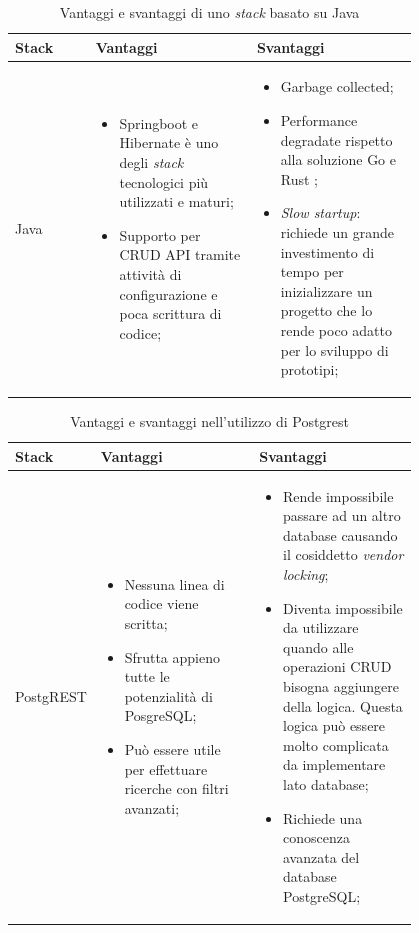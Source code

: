 \documentclass{article}
\begin{document}
\begin{table}[H]
    \centering
    \begin{tabular}{|l|p{0.4\linewidth}|p{0.4\linewidth}|}
        \hline
         Stack & Vantaggi & Svantaggi \\
        \hline
        Java  & 
        \begin{itemize}
          \item Springboot e Hibernate è uno degli \textit{stack} tecnologici più utilizzati e maturi;
          \item Supporto per CRUD API tramite attività di configurazione e poca scrittura di codice;
        \end{itemize} 
        & 
        \begin{itemize}
            \item Garbage collected;
            \item Performance degradate rispetto alla soluzione Go e Rust \cite{go_java_php} \cite{http_benchmark};
            \item \textit{Slow startup}: richiede un grande investimento di tempo per inizializzare un progetto che lo rende poco adatto per lo sviluppo di prototipi;
        \end{itemize}\\ 
        \hline
    \end{tabular}
    \caption{Vantaggi e svantaggi di uno \textit{stack} basato su Java}
    \label{tab:java_tech_stack}
\end{table}

\begin{table}[H]
  \center
  \begin{tabular}{|l|p{0.4\linewidth}|p{0.4\linewidth}|}
    \hline
         Stack & Vantaggi & Svantaggi \\
        \hline
        PostgREST & 
        \begin{itemize}
          \item Nessuna linea di codice viene scritta;
          \item Sfrutta appieno tutte le potenzialità di PosgreSQL;
          \item Può essere utile per effettuare ricerche con filtri avanzati;
        \end{itemize} 
        & 
        \begin{itemize}
            \item Rende impossibile passare ad un altro database causando il cosiddetto \textit{vendor locking};
            \item Diventa impossibile da utilizzare quando alle operazioni CRUD bisogna aggiungere della logica. Questa logica può essere molto complicata da implementare lato database;
            \item Richiede una conoscenza avanzata del database PostgreSQL;
        \end{itemize}\\ 
        \hline
    \hline
  \end{tabular}
  \caption{Vantaggi e svantaggi nell'utilizzo di Postgrest}
  \label{tab:postgrest_tech_stack}
\end{table}
\end{document}
